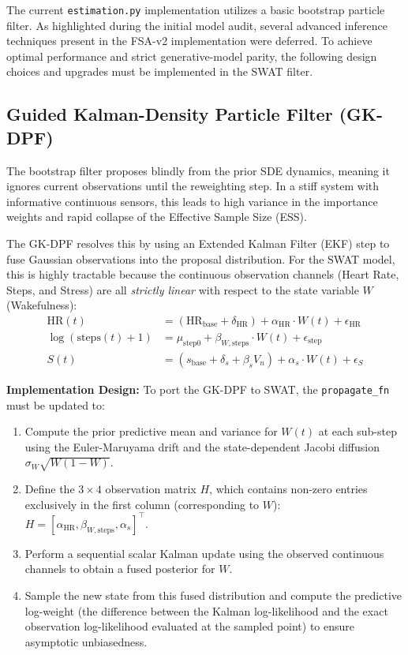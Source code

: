 \documentclass[11pt,a4paper]{article}
\begin{document}
The current \texttt{estimation.py} implementation utilizes a basic bootstrap particle filter. As highlighted during the initial model audit, several advanced inference techniques present in the FSA-v2 implementation were deferred. To achieve optimal performance and strict generative-model parity, the following design choices and upgrades must be implemented in the SWAT filter.

\subsection{Guided Kalman-Density Particle Filter (GK-DPF)}
The bootstrap filter proposes blindly from the prior SDE dynamics, meaning it ignores current observations until the reweighting step. In a stiff system with informative continuous sensors, this leads to high variance in the importance weights and rapid collapse of the Effective Sample Size (ESS). 

The GK-DPF resolves this by using an Extended Kalman Filter (EKF) step to fuse Gaussian observations into the proposal distribution. For the SWAT model, this is highly tractable because the continuous observation channels (Heart Rate, Steps, and Stress) are all \textit{strictly linear} with respect to the state variable $W$ (Wakefulness):
\begin{align*}
\text{HR}(t) &= (\text{HR}_{\text{base}} + \delta_{\text{HR}}) + \alpha_{\text{HR}} \cdot W(t) + \epsilon_{\text{HR}} \\
\log(\text{steps}(t) + 1) &= \mu_{\text{step}0} + \beta_{W,\text{steps}} \cdot W(t) + \epsilon_{\text{step}} \\
S(t) &= (s_{\text{base}} + \delta_s + \beta_s V_n) + \alpha_s \cdot W(t) + \epsilon_S
\end{align*}

\textbf{Implementation Design:}
To port the GK-DPF to SWAT, the \texttt{propagate\_fn} must be updated to:
\begin{enumerate}
    \item Compute the prior predictive mean and variance for $W(t)$ at each sub-step using the Euler-Maruyama drift and the state-dependent Jacobi diffusion $\sigma_W \sqrt{W(1-W)}$.
    \item Define the $3 \times 4$ observation matrix $H$, which contains non-zero entries exclusively in the first column (corresponding to $W$): $H = [\alpha_{\text{HR}}, \beta_{W,\text{steps}}, \alpha_s]^\top$.
    \item Perform a sequential scalar Kalman update using the observed continuous channels to obtain a fused posterior for $W$.
    \item Sample the new state from this fused distribution and compute the predictive log-weight (the difference between the Kalman log-likelihood and the exact observation log-likelihood evaluated at the sampled point) to ensure asymptotic unbiasedness.
\end{enumerate}
\end{document}
